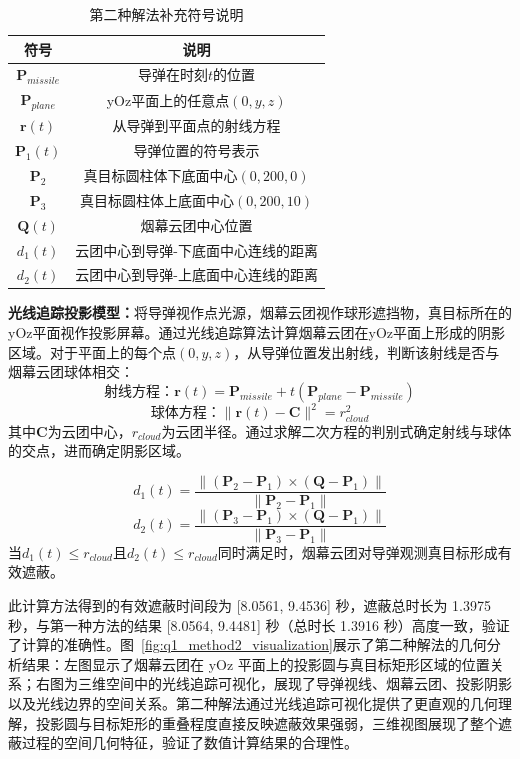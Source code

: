 \begin{table}[htbp]
\centering
\caption{第二种解法补充符号说明}
\label{tab:symbols_q1_method2}
\begin{tabular}{cc}
\toprule
\textbf{符号} & \textbf{说明} \\
\midrule
$\mathbf{P}_{missile}$ & 导弹在时刻$t$的位置 \\
$\mathbf{P}_{plane}$ & yOz平面上的任意点$(0, y, z)$ \\
$\mathbf{r}(t)$ & 从导弹到平面点的射线方程 \\
$\mathbf{P}_1(t)$ & 导弹位置的符号表示 \\
$\mathbf{P}_2$ & 真目标圆柱体下底面中心$(0, 200, 0)$ \\
$\mathbf{P}_3$ & 真目标圆柱体上底面中心$(0, 200, 10)$ \\
$\mathbf{Q}(t)$ & 烟幕云团中心位置 \\
$d_1(t)$ & 云团中心到导弹-下底面中心连线的距离 \\
$d_2(t)$ & 云团中心到导弹-上底面中心连线的距离 \\
\bottomrule
\end{tabular}
\end{table}

\textbf{光线追踪投影模型：}将导弹视作点光源，烟幕云团视作球形遮挡物，真目标所在的yOz平面视作投影屏幕。通过光线追踪算法计算烟幕云团在yOz平面上形成的阴影区域。对于平面上的每个点$(0, y, z)$，从导弹位置发出射线，判断该射线是否与烟幕云团球体相交：
\[
\text{射线方程：} \mathbf{r}(t) = \mathbf{P}_{missile} + t(\mathbf{P}_{plane} - \mathbf{P}_{missile})
\]
\[
\text{球体方程：} \|\mathbf{r}(t) - \mathbf{C}\|^2 = r_{cloud}^2
\]
其中$\mathbf{C}$为云团中心，$r_{cloud}$为云团半径。通过求解二次方程的判别式确定射线与球体的交点，进而确定阴影区域。

\[
d_1(t) = \frac{\|(\mathbf{P}_2 - \mathbf{P}_1) \times (\mathbf{Q} - \mathbf{P}_1)\|}{\|\mathbf{P}_2 - \mathbf{P}_1\|}
\]
\[
d_2(t) = \frac{\|(\mathbf{P}_3 - \mathbf{P}_1) \times (\mathbf{Q} - \mathbf{P}_1)\|}{\|\mathbf{P}_3 - \mathbf{P}_1\|}
\]
当$d_1(t) \leq r_{cloud}$且$d_2(t) \leq r_{cloud}$同时满足时，烟幕云团对导弹观测真目标形成有效遮蔽。

此计算方法得到的有效遮蔽时间段为 [8.0561, 9.4536] 秒，遮蔽总时长为 1.3975 秒，与第一种方法的结果 [8.0564, 9.4481] 秒（总时长 1.3916 秒）高度一致，验证了计算的准确性。图~\ref{fig:q1_method2_visualization}展示了第二种解法的几何分析结果：左图显示了烟幕云团在 yOz 平面上的投影圆与真目标矩形区域的位置关系；右图为三维空间中的光线追踪可视化，展现了导弹视线、烟幕云团、投影阴影以及光线边界的空间关系。第二种解法通过光线追踪可视化提供了更直观的几何理解，投影圆与目标矩形的重叠程度直接反映遮蔽效果强弱，三维视图展现了整个遮蔽过程的空间几何特征，验证了数值计算结果的合理性。

